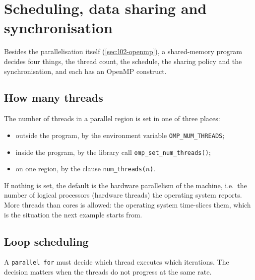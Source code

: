 \documentclass[../main.tex]{subfiles}
\begin{document}
\section{Scheduling, data sharing and synchronisation}
\label{sec:l02-scheduling}

Besides the parallelisation itself (\cref{sec:l02-openmp}), a shared-memory
program decides four things, the thread count, the schedule, the sharing policy
and the synchronisation, and each has an OpenMP construct.

\subsection{How many threads}

The number of threads in a parallel region is set in one of three places:
\begin{itemize}
  \item outside the program, by the environment variable
    \texttt{OMP\_NUM\_THREADS};
  \item inside the program, by the library call
    \texttt{omp\_set\_num\_threads()};
  \item on one region, by the clause \texttt{num\_threads(}$n$\texttt{)}.
\end{itemize}
If nothing is set, the default is the hardware
parallelism of the machine, i.e.\ the number of logical processors
(hardware threads) the operating system reports.  More threads than cores is allowed: the operating
system time-slices them, which is the situation the next example starts
from.

\subsection{Loop scheduling}

A \texttt{parallel for} must decide which thread executes which
iterations.  The decision matters when the threads do not progress at the
same rate.
\end{document}
